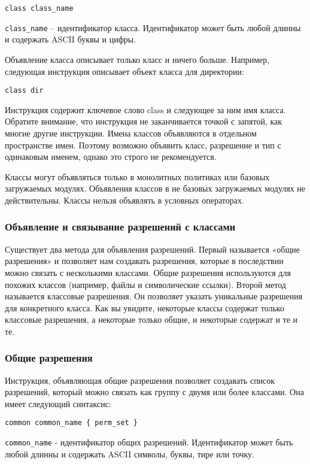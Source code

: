 \documentclass{./../class/UIR}
\begin{document}
\verb"class class_name"

    \verb"class_name" – идентификатор класса. Идентификатор может быть
    любой длинны и содержать ASCII буквы и цифры.

    Объявление класса описывает только класс и ничего больше. Например, следующая
    инструкция описывает объект класса для директории:
\begin{verbatim}
class dir
\end{verbatim}
    Инструкция содержит ключевое слово class и следующее за ним имя
    класса. Обратите внимание, что инструкция не заканчивается точкой с запятой, как
    многие другие инструкции. Имена классов объявляются в отдельном пространстве
    имен. Поэтому возможно объявить класс, разрешение и тип с одинаковым именем,
    однако это строго не рекомендуется.

    Классы могут объявляться только в монолитных политиках или базовых загружаемых
    модулях. Объявления классов в не базовых загружаемых модулях не действительны.
    Классы нельзя объявлять в условных операторах.

\subsubsection{Объявление и связывание разрешений с классами}

    Существует два метода для объявления разрешений. Первый называется «общие
    разрешения» и позволяет нам создавать разрешения, которые в последствии
    можно связать с несколькими классами. Общие разрешения используются для
    похожих классов (например, файлы и символические ссылки). Второй метод
    называется классовые разрешения. Он позволяет указать уникальные разрешения
    для конкретного класса. Как вы увидите, некоторые классы содержат только
    классовые разрешения, а некоторые только общие, и некоторые содержат и те и
    те.

\subsubsection{Общие разрешения}
    Инструкция, объявляющая общие разрешения позволяет создавать список
    разрешений, который можно связать как группу с двумя или более классами. Она
    имеет следующий синтаксис:
\begin{verbatim}
common common_name { perm_set }
\end{verbatim}
    \verb"common_name" - идентификатор общих разрешений. Идентификатор может
    быть любой длинны и содержать ASCII символы, буквы, тире или точку.
\end{document}
